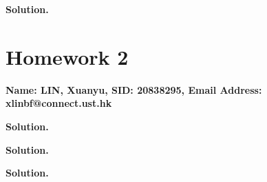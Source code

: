 \documentclass[10pt]{article}
\begin{document}
\textbf{Solution.}

\newpage

\section*{Homework 2}

\textbf{Name: LIN, Xuanyu, SID: 20838295, Email Address: xlinbf@connect.ust.hk}

\begin{Problem}
	
\end{Problem}

\textbf{Solution.}

\newpage

\begin{Problem}
	
\end{Problem}

\textbf{Solution.}

\newpage

\begin{Problem}
	
\end{Problem}

\textbf{Solution.}

\end{document}
